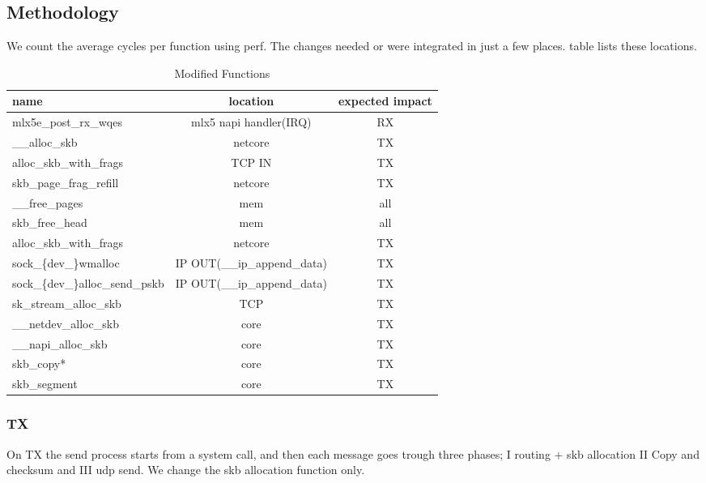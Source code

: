 \subsection{Methodology}
We count the average cycles per function using perf. The changes needed or \oursys were integrated in just a few places. table lists these locations.

\begin{table*}
\centering
\begin{tabular}{l|c|c}
name & location & expected impact \\\hline
mlx5e\_post\_rx\_wqes & mlx5 napi handler(IRQ) & RX\\
\_\_alloc\_skb & net\/core & TX\\
alloc\_skb\_with\_frags & TCP IN & TX\\
skb\_page\_frag\_refill & net\/core & TX\\
\_\_free\_pages & mem & all\\
skb\_free\_head & mem & all\\
alloc\_skb\_with\_frags & net\/core & TX\\
sock\_\{dev\_\}wmalloc & IP OUT(\_\_ip\_append\_data) & TX\\
sock\_\{dev\_\}alloc\_send\_pskb & IP OUT(\_\_ip\_append\_data)& TX\\
sk\_stream\_alloc\_skb & TCP & TX\\
\_\_netdev\_alloc\_skb & core & TX\\
\_\_napi\_alloc\_skb & core & TX\\
skb\_copy* & core & TX \\
skb\_segment & core & TX\\
\hline
\end{tabular}
\caption{\label{tab:func_list}Modified Functions}
\end{table*}

\subsubsection{TX}
On TX the send process starts from a system call, and then each message goes trough three phases; I routing + skb allocation II Copy and checksum and III udp send. We change the skb allocation function only. 